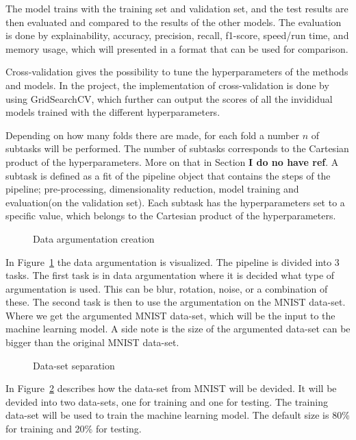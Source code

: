 The model trains with the training set and validation set, and the test results are then evaluated and compared to the results of the other models. The evaluation is done by explainability, accuracy, precision, recall, f1-score, speed/run time, and memory usage, which will presented in a format that can be used for comparison.


Cross-validation gives the possibility to tune the hyperparameters of the methods and models. In the project, the implementation of cross-validation is done by using GridSearchCV, which further can output the scores of all the invididual models trained with the different hyperparameters.


Depending on how many folds there are made, for each fold a number $n$ of subtasks will be performed. The number of subtasks corresponds to the Cartesian product of the hyperparameters. More on that in Section \textbf{I do no have ref}. A subtask is defined as a fit of the pipeline object that contains the steps of the pipeline; pre-processing, dimensionality reduction, model training and evaluation(on the validation set). Each subtask has the hyperparameters set to a specific value, which belongs to the Cartesian product of the hyperparameters.


\begin{figure}[htb!]
    \centering
    
    \caption{Data argumentation creation}
    \label{fig:data-argumentation-create}
\end{figure}

In Figure~\ref{fig:data-argumentation-create} the data argumentation is visualized. The pipeline is divided into 3 tasks. The first task is in data argumentation where it is decided what type of argumentation is used. This can be blur, rotation, noise, or a combination of these. The second task is then to use the argumentation on the MNIST data-set. Where we get the argumented MNIST data-set, which will be the input to the machine learning model. A side note is the size of the argumented data-set can be bigger than the original MNIST data-set.

\begin{figure}[htb!]
    \centering
    
    \caption{Data-set separation}
    \label{fig:data-set-sepa}
\end{figure}

In Figure~\ref{fig:data-set-sepa} describes how the data-set from MNIST will be devided. It will be devided into two data-sets, one for training and one for testing. The training data-set will be used to train the machine learning model. The default size is 80\% for training and 20\% for testing.